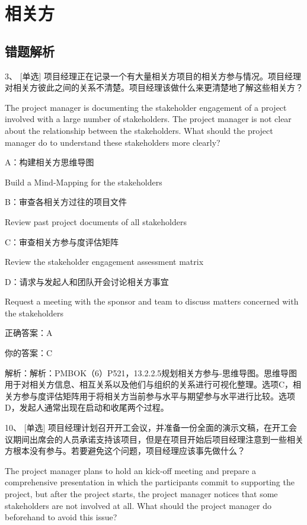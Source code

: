 
\chapter{相关方}

\section{错题解析}

3、 [单选] 项目经理正在记录一个有大量相关方项目的相关方参与情况。项目经理对相关方彼此之间的关系不清楚。项目经理该做什么来更清楚地了解这些相关方？

The project manager is documenting the stakeholder engagement of a project involved with a large number of stakeholders. The project manager is not clear about the relationship between the stakeholders. What should the project manager do to understand these stakeholders more clearly?

A：构建相关方思维导图

Build a Mind-Mapping for the stakeholders

B：审查各相关方过往的项目文件

Review past project documents of all stakeholders

C：审查相关方参与度评估矩阵

Review the stakeholder engagement assessment matrix

D：请求与发起人和团队开会讨论相关方事宜

Request a meeting with the sponsor and team to discuss matters concerned with the stakeholders

正确答案：A

你的答案：C

解析：解析：PMBOK（6）P521，13.2.2.5规划相关方参与-思维导图。思维导图用于对相关方信息、相互关系以及他们与组织的关系进行可视化整理。选项C，相关方参与度评估矩阵用于将相关方当前参与水平与期望参与水平进行比较。选项D，发起人通常出现在启动和收尾两个过程。

10、 [单选] 项目经理计划召开开工会议，并准备一份全面的演示文稿，在开工会议期间出席会的人员承诺支持该项目，但是在项目开始后项目经理注意到一些相关方根本没有参与。若要避免这个问题，项目经理应该事先做什么？

The project manager plans to hold an kick-off meeting and prepare a comprehensive presentation in which the participants commit to supporting the project, but after the project starts, the project manager notices that some stakeholders are not involved at all. What should the project manager do beforehand to avoid this issue?

